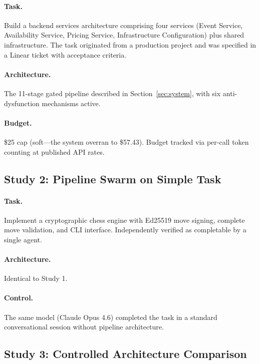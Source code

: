 \documentclass[11pt,a4paper]{article}
\begin{document}
\paragraph{Task.} Build a backend services architecture comprising four services (Event Service, Availability Service, Pricing Service, Infrastructure Configuration) plus shared infrastructure. The task originated from a production project and was specified in a Linear ticket with acceptance criteria.

\paragraph{Architecture.} The 11-stage gated pipeline described in Section~\ref{sec:system}, with six anti-dysfunction mechanisms active.

\paragraph{Budget.} \$25 cap (soft---the system overran to \$57.43). Budget tracked via per-call token counting at published API rates.

\subsection{Study 2: Pipeline Swarm on Simple Task}

\paragraph{Task.} Implement a cryptographic chess engine with Ed25519 move signing, complete move validation, and CLI interface. Independently verified as completable by a single agent.

\paragraph{Architecture.} Identical to Study 1.

\paragraph{Control.} The same model (Claude Opus 4.6) completed the task in a standard conversational session without pipeline architecture.

\subsection{Study 3: Controlled Architecture Comparison}
\end{document}
